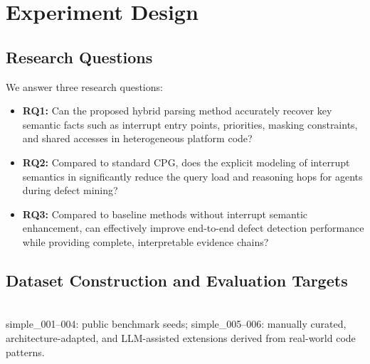 \documentclass[a4paper,UKenglish,cleveref, autoref, thm-restate]{lipics-v2021}
\begin{document}
\FloatBarrier
\section{Experiment Design}

\subsection{Research Questions}

We answer three research questions:
\begin{itemize}
  \item \textbf{RQ1:} Can the proposed hybrid parsing method accurately recover key semantic facts such as interrupt entry points, priorities, masking constraints, and shared accesses in heterogeneous platform code?
  \item \textbf{RQ2:} Compared to standard CPG, does the explicit modeling of interrupt semantics in \iacpg significantly reduce the query load and reasoning hops for agents during defect mining?
  \item \textbf{RQ3:} Compared to baseline methods without interrupt semantic enhancement, can \iacpg effectively improve end-to-end defect detection performance while providing complete, interpretable evidence chains?
\end{itemize}

\subsection{Dataset Construction and Evaluation Targets}

\begin{table}[!t]
  \centering
  \caption{Benchmark statistics by defect type (96 instances, 4 ISAs $\times$ 24 templates).}
  \label{tab:dataset_src}
  \\[4pt]
  \footnotesize{simple\_001--004: public benchmark seeds; simple\_005--006: manually curated, architecture-adapted, and LLM-assisted extensions derived from real-world code patterns.}
\end{table}
\end{document}
